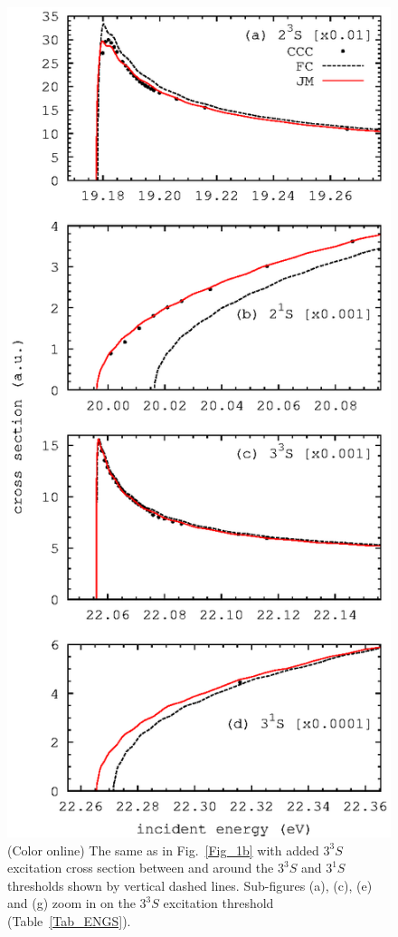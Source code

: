 \documentclass[aip
, pra
, showpacs
, aps
, twocolumn
, groupedaddress
, floatfix
]{revtex4}
\begin{document}
\begin{figure}[htb]
\includegraphics[scale=1]{fig2.ps}
\caption{(Color online)
The same as in Fig.~\ref{Fig_1b} with added $3^3S$ excitation cross section
between and around the $3^3S$ and $3^1S$ thresholds shown by vertical dashed lines.
Sub-figures (a), (c), (e) and (g) zoom in on the $3^3S$ excitation threshold (Table~\ref{Tab_ENGS}).
}
\label{Fig_2}
\end{figure}
\end{document}

